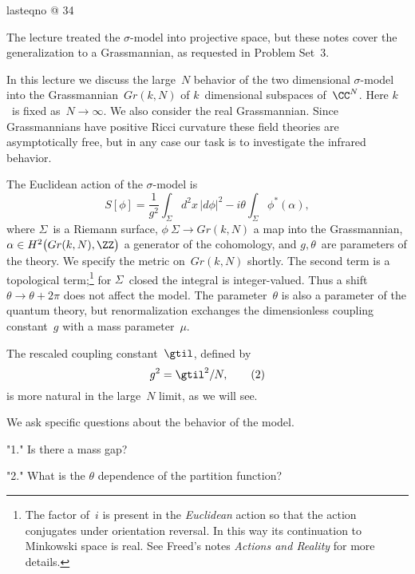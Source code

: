 \document


 \comment
 lasteqno @ 34
 \endcomment

 The lecture treated the $\sigma $-model into projective space, but these
notes cover the generalization to a Grassmannian, as requested in Problem
Set~3.
        \endproclaim

\bigskip 
 
In this lecture we discuss the large~$N$ behavior of the two dimensional
$\sigma $-model into the Grassmannian~$Gr(k,N)$ of $k$~dimensional subspaces
of~$\CC^N$.  Here $k$~is fixed as~$N\to\infty $.  We also consider the real
Grassmannian.  Since Grassmannians have positive Ricci curvature these field
theories are asymptotically free, but in any case our task is to investigate
the infrared behavior. 
 
The Euclidean action of the $\sigma $-model is 
  $$ S[\phi ] = \frac{1}{g^2}\int_{\Sigma }d^2x\,|d\phi |^2 - i\theta
     \int_{\Sigma} \phi ^*(\alpha ), \tag{1} $$
where $\Sigma$~is a Riemann surface, $\phi \:\Sigma \to Gr(k,N)$ a map into
the Grassmannian, $\alpha \in H^2\bigl(Gr(k,N),\ZZ \bigr)$ a generator of the
cohomology, and $g,\theta $~are parameters of the theory.  We specify the
metric on~$Gr(k,N)$ shortly.  The second term is a topological
term;\footnote{The factor of~$i$ is present in the {\it Euclidean\/} action
so that the action conjugates under orientation reversal.  In this way its
continuation to Minkowski space is real.  See Freed's notes {\it Actions and
Reality\/} for more details.} for $\Sigma $~closed the integral is
integer-valued.  Thus a shift $\theta \to\theta +2\pi $ does not affect the
model.  The parameter~$\theta $ is also a parameter of the quantum theory,
but renormalization exchanges the dimensionless coupling constant~$g$ with a
mass parameter~$\mu $.

The rescaled coupling constant~$\gtil$, defined by 
  $$ g^2 = \gtil^2/N,  \tag{2} $$
is more natural in the large~$N$ limit, as we will see.


We ask specific questions about the behavior of the model. 

 \roster
 \item"1." Is there a mass gap? 
 \item"2." What is the $\theta $ dependence of the partition function?

